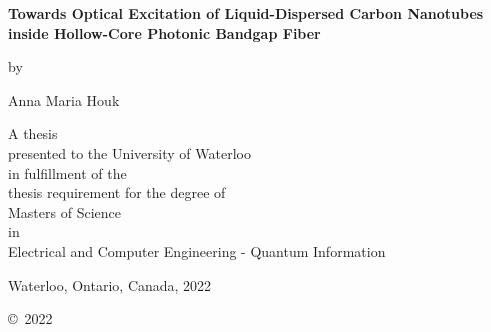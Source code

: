 \pagestyle{empty}

\begin{titlepage}
        \begin{center}
        \vspace*{1.0cm}

        \Huge
        {\bf Towards Optical Excitation of Liquid-Dispersed Carbon Nanotubes inside Hollow-Core Photonic Bandgap Fiber}

        \vspace*{1.0cm}

        \normalsize
        by \\

        \vspace*{1.0cm}

        \Large
        Anna Maria Houk\\

        \vspace*{3.0cm}

        \normalsize
        A thesis \\
        presented to the University of Waterloo \\ 
        in fulfillment of the \\
        thesis requirement for the degree of \\
        Masters of Science \\
        in \\
        Electrical and Computer Engineering - Quantum Information  \\

        \vspace*{2.0cm}

        Waterloo, Ontario, Canada, 2022 \\

        \vspace*{1.0cm}

        \copyright\  2022 \\
        \end{center}
\end{titlepage}

\pagestyle{plain}
\setcounter{page}{2}

